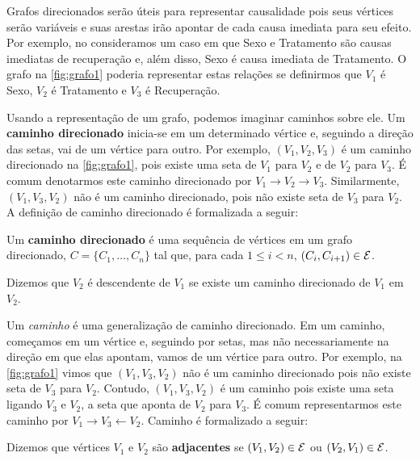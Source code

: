 Grafos direcionados serão úteis para 
representar causalidade pois 
seus vértices serão variáveis e
suas arestas irão apontar de 
cada causa imediata para seu efeito.
Por exemplo, no 
consideramos um caso em que Sexo e Tratamento são
causas imediatas de recuperação e, além disso,
Sexo é causa imediata de Tratamento.
O grafo na \cref{fig:grafo1} poderia
representar estas relações se definirmos que
$V_1$ é Sexo, $V_2$ é Tratamento e 
$V_3$ é Recuperação.

Usando a representação de um grafo,
podemos imaginar caminhos sobre ele.
Um \textbf{caminho direcionado} inicia-se 
em um determinado vértice e, 
seguindo a direção das setas, 
vai de um vértice para outro.
Por exemplo, $(V_1, V_2, V_3)$ é
um caminho direcionado na 
\cref{fig:grafo1}, pois existe
uma seta de $V_1$ para $V_2$ e
de $V_2$ para $V_3$.
É comum denotarmos este caminho direcionado por
$V_1 \rightarrow V_2 \rightarrow V_3$.
Similarmente, $(V_1, V_3, V_2)$ não é
um caminho direcionado, pois
não existe seta de $V_3$ para $V_2$.
A definição de caminho direcionado é
formalizada a seguir:

\begin{definition}
 \label{lem:caminhodir}
 Um \textbf{caminho direcionado} é 
 uma sequência de vértices em
 um grafo direcionado,
 $C = \{C_1, \ldots, C_n\}$ tal que, 
 para cada $1 \leq i < n$,
 $(C_i, C_{i+1}) \in {\mathcal E}$.
\end{definition}

\begin{definition}
 \label{def:descendente}
 Dizemos que $V_2$ é descendente de $V_1$ se
 existe um caminho direcionado de $V_1$ em $V_2$.
\end{definition}

Um \textit{caminho} é uma generalização 
de caminho direcionado.
Em um caminho, começamos em um vértice e,
seguindo por setas, mas 
não necessariamente na direção 
em que elas apontam, vamos
de um vértice para outro.
Por exemplo, na \cref{fig:grafo1}
vimos que $(V_1, V_3, V_2)$ não é um 
caminho direcionado pois não existe seta de $V_3$ para $V_2$.
Contudo, $(V_1, V_3, V_2)$ é um caminho pois
existe uma seta ligando $V_3$ e $V_2$,
a seta que aponta de $V_2$ para $V_3$.
É comum representarmos este caminho por
$V_1 \rightarrow V_3 \leftarrow V_2$.
Caminho é formalizado a seguir:

\begin{definition}
 \label{def:adj}
 Dizemos que vértices $V_1$ e $V_2$ 
 são \textbf{adjacentes} se
 $(V_1, V_2) \in {\mathcal E}$ ou
 $(V_2, V_1) \in {\mathcal E}$.
\end{definition}

